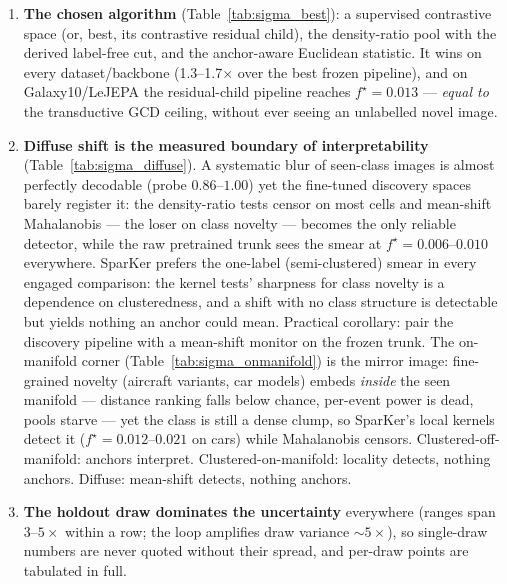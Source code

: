 \documentclass[10pt]{article}
\begin{document}
\begin{enumerate}
  remaining loss is such an abstention (daggers in the tables), and the one
  arm that declines everywhere (SupCon at holdout 4, all $n_{\min}$) is
  exactly the arm whose pools are irreparably impure.  The $n_{\min}$ sweep
  says: engage as small as the clustering bears ($n_{\min}{=}5$), at no
  purity cost.
\item \textbf{The chosen algorithm} (Table~\ref{tab:sigma_best}): a
  supervised contrastive space (or, best, its contrastive residual child),
  the density-ratio pool with the derived label-free cut, and the
  anchor-aware Euclidean statistic.  It wins on every dataset/backbone
  (1.3--1.7$\times$ over the best frozen pipeline), and on Galaxy10/LeJEPA
  the residual-child pipeline reaches $f^\star{=}0.013$ --- \emph{equal to}
  the transductive GCD ceiling, without ever seeing an unlabelled novel
  image.
\item \textbf{Diffuse shift is the measured boundary of interpretability}
  (Table~\ref{tab:sigma_diffuse}).  A systematic blur of seen-class images is
  almost perfectly decodable (probe $0.86$--$1.00$) yet the fine-tuned
  discovery spaces barely register it: the density-ratio tests censor on most
  cells and mean-shift Mahalanobis --- the loser on class novelty --- becomes
  the only reliable detector, while the raw pretrained trunk sees the smear
  at $f^\star{=}0.006$--$0.010$ everywhere.  SparKer prefers the one-label
  (semi-clustered) smear in every engaged comparison: the kernel tests'
  sharpness for class novelty is a dependence on clusteredness, and a shift
  with no class structure is detectable but yields nothing an anchor could
  mean.  Practical corollary: pair the discovery pipeline with a mean-shift
  monitor on the frozen trunk.  The on-manifold corner
  (Table~\ref{tab:sigma_onmanifold}) is the mirror image: fine-grained
  novelty (aircraft variants, car models) embeds \emph{inside} the seen
  manifold --- distance ranking falls below chance, per-event power is dead,
  pools starve --- yet the class is still a dense clump, so SparKer's local
  kernels detect it ($f^\star{=}0.012$--$0.021$ on cars) while Mahalanobis
  censors.  Clustered-off-manifold: anchors interpret.  Clustered-on-manifold:
  locality detects, nothing anchors.  Diffuse: mean-shift detects, nothing
  anchors.
\item \textbf{The holdout draw dominates the uncertainty} everywhere
  (ranges span $3$--$5\times$ within a row; the loop amplifies draw
  variance $\sim$$5\times$), so single-draw numbers are never quoted without
  their spread, and per-draw points are tabulated in full.
\end{enumerate}
\end{document}
